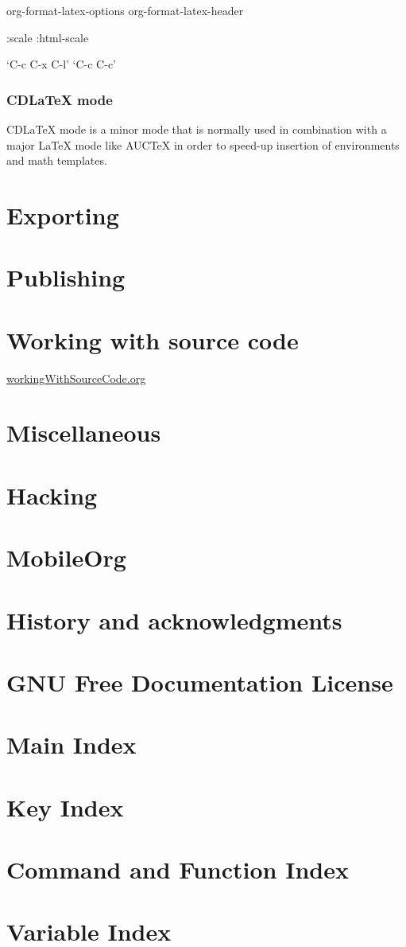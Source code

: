 \documentclass[11pt]{article}
\begin{document}
org-format-latex-options
org-format-latex-header

:scale
:html-scale

‘C-c C-x C-l’
‘C-c C-c’
\subsubsection{CDLaTeX mode}
\label{sec:orgc703a2c}
CDLaTeX mode is a minor mode that is normally used in combination with a
major \LaTeX{} mode like AUCTeX in order to speed-up insertion of environments
and math templates.
\section{Exporting}
\label{sec:org4929232}
\section{Publishing}
\label{sec:orgf4ad730}
\section{Working with source code}
\label{sec:orgc0a3521}
\url{workingWithSourceCode.org}
\section{Miscellaneous}
\label{sec:org9c7a1d4}
\section{Hacking}
\label{sec:org0bc7696}
\section{MobileOrg}
\label{sec:org1725b44}
\section{History and acknowledgments}
\label{sec:org6e89321}
\section{GNU Free Documentation License}
\label{sec:org9f20bef}
\section{Main Index}
\label{sec:orgb7a6f92}
\section{Key Index}
\label{sec:orgabd180d}
\section{Command and Function Index}
\label{sec:org10878f9}
\section{Variable Index}
\label{sec:orgc9b516a}
\end{document}
